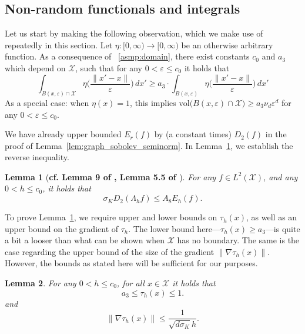 \documentclass[twoside]{article}
\newcommand{\vol}{\text{vol}}
\newcommand{\1}{\mathbf{1}}
\newcommand{\Xset}{\mathcal{X}}
\newcommand{\Leb}{L}
\newtheorem{lemma}{Lemma}
\theoremstyle{definition}
\theoremstyle{remark}
\begin{document}
\subsection{Non-random functionals and integrals}
\label{subsec:integrals}

Let us start by making the following observation, which we make use of repeatedly in this section. Let $\eta: [0,\infty) \to [0,\infty)$ be an otherwise arbitrary function. As a consequence of ~\ref{asmp:domain}, there exist constants $c_0$ and $a_3$ which depend on $\Xset$, such that for any $0 < \varepsilon \leq c_0$ it holds that 
\begin{equation}
\label{eqn:integral_boundary}
\int_{B(x,\varepsilon) \cap \Xset} \eta\biggl(\frac{\|x' - x\|}{\varepsilon}\biggr) \,dx' \geq a_3 \cdot \int_{B(x,\varepsilon)} \eta\biggl(\frac{\|x' - x\|}{\varepsilon}\biggr) \,dx'
\end{equation}
As a special case: when $\eta(x) = 1$, this implies $\vol\bigl(B(x,\varepsilon) \cap \Xset\bigr) \geq a_3 \nu_d \varepsilon^d$ for any $0 < \varepsilon \leq c_0$.

We have already upper bounded $E_r(f)$ by (a constant times) $D_2(f)$ in the proof of Lemma~\ref{lem:graph_sobolev_seminorm}. In Lemma~\ref{lem:first_order_graph_sobolev_seminorm_expected_lb}, we establish the reverse inequality.
\begin{lemma}[\textbf{cf. Lemma 9 of \citet{trillos2019}, Lemma 5.5 of \citet{burago2014}}]
	\label{lem:first_order_graph_sobolev_seminorm_expected_lb}
	For any $f \in \Leb^2(\Xset)$, and any $0 < h \leq c_0$, it holds that
	\begin{equation*}
	\sigma_KD_2(\Lambda_hf) \leq A_8 E_h(f).
	\end{equation*}
\end{lemma}

To prove Lemma~\ref{lem:first_order_graph_sobolev_seminorm_expected_lb}, we require upper and lower bounds on $\tau_h(x)$, as well as an upper bound on the gradient of $\tau_h$. The lower bound here---$\tau_h(x) \geq a_3$---is quite a bit a looser than what can be shown when $\Xset$ has no boundary. The same is the case regarding the upper bound of the size of the gradient $\|\nabla \tau_h(x)\|$. However, the bounds as stated here will be sufficient for our purposes.
\begin{lemma}
	\label{lem:tau_bound}
	For any $0 < h \leq c_0$, for all $x \in \Xset$ it holds that
	\begin{equation*}
	a_3 \leq \tau_h(x) \leq 1.
	\end{equation*}
	and 
	\begin{equation*}
	\|\nabla \tau_h(x)\| \leq \frac{1}{\sqrt{d\sigma_K} h}.
	\end{equation*}
\end{lemma}
\end{document}
